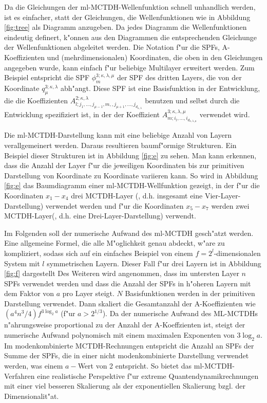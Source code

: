 Da die Gleichungen der ml-MCTDH-Wellenfunktion schnell unhandlich werden, ist es einfacher, statt der Gleichungen, die Wellenfunktionen 
wie in Abbildung \ref{fig:tree}
als Diagramm anzugeben. Da jedes Diagramm die Wellenfunktionen eindeutig definert, k"onnen aus den Diagrammen die entsprechenden
Gleichunge der Wellenfunktionen abgeleitet werden.
Die Notation f"ur die SPFs, A-Koeffizienten und (mehrdimensionalen) Koordinaten, die oben in den Gleichungen angegeben wurde,
kann einfach f"ur beliebige Multilayer erweitert werden. Zum Beispiel
entspricht die SPF $ \phi^{3;\kappa, \lambda, \mu}_{m}  $  der SPF des dritten Layers, die von der Koordinate $q^{3;\kappa, \lambda}_\mu$
abh"angt. Diese SPF ist eine Basisfunktion in der Entwicklung, die die Koeffizienten $A^{2;\kappa, \lambda}_{l;j_1,...,j_{\mu-1},m,
,j_{\mu+1},...,j_{d_{\kappa,\lambda}}}$ benutzen und selbst durch die Entwicklung spezifiziert ist, 
in der der Koeffizient $A^{3;\kappa, \lambda,\mu}_{m;i_l,...,i_{d_{\kappa, \lambda,\mu}}}$ verwendet wird.

Die ml-MCTDH-Darstellung kann mit eine beliebige Anzahl von Layern verallgemeinert werden.
Daraus resultieren baumf"ormige Strukturen.
Ein Beispiel dieser Strukturen ist in Abbildung \ref{fig:e} zu sehen. Man kann erkennen, dass 
die Anzahl der Layer f"ur die jeweiligen Koordinaten bis zur primitiven Darstellung von 
Koordinate zu Koordinate variieren kann.
So wird in Abbildung \ref{fig:e} das Baumdiagramm einer ml-MCTDH-Wellfunktion gezeigt, 
in der f"ur die Koordinaten $ x_1-x_4 $ drei MCTDH-Layer (, d.h. insgesamt eine Vier-Layer-Darstellung) verwendet werden
und f"ur die Koordinaten $ x_5 - x_7 $  werden zwei MCTDH-Layer(, d.h. eine Drei-Layer-Darstellung) verwendt.

Im Folgenden soll der numerische Aufwand des ml-MCTDH gesch"atzt werden. 
Eine allgemeine Formel, die alle M"oglichkeit genau abdeckt, w"are zu kompliziert,
sodass sich auf ein einfaches Beispiel von einem $f=2^l$-dimensionalen System mit 
$l$ symmetrischen Layern. Dieser Fall f"ur drei Layern ist in Abbildung \ref{fig:f} dargestellt
Des Weiteren wird angenommen, dass im untersten Layer $n$ SPFs verwendet werden und dass die Anzahl der SPFs in
h"oheren Layern mit dem Faktor von $a$ pro Layer steigt.
$N$ Basisfunktionen werden in der primitiven Darstellung verwendet. Dann skaliert die Gesamtanzahl der A-Koeffizienten
wie $(a^4n^{3}/4)f^{3\log_{2}a}$ (f"ur $a>2^{1/3}$). 
Da der numerische Aufwand des ML-MCTDHs n"ahrungsweise proportional zu der Anzahl der A-Koeffzienten ist, steigt der numerische Aufwand polynomisch
mit einem maximalen Exponenten von $3\log_{2}a$.\cite{Mreview2}
Im modenkombinierte MCTDH-Rechnungen entspricht die Anzahl an SPFs der Summe der SPFs, die in einer nicht modenkombinierte
Darstellung verwendet werden, was einem $a-$Wert von 2 entspricht.
So bietet das ml-MCTDH-Verfahren eine realistische Perspektive f"ur extreme Quantendynamikrechnungen mit einer viel besseren Skalierung als 
der exponentiellen Skalierung bzgl. der Dimensionalit"at.

